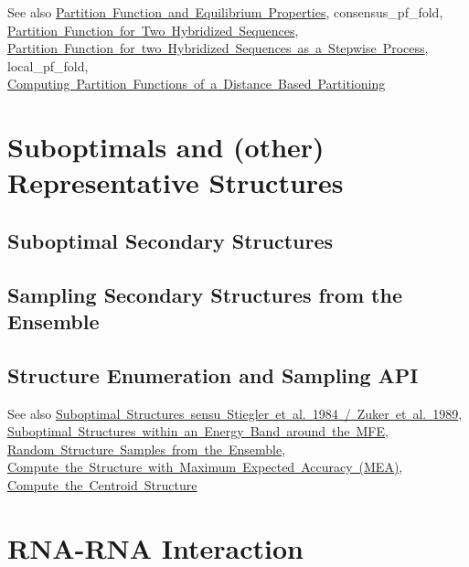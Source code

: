 \begin{DoxySeeAlso}{See also}
\mbox{\hyperlink{group__pf__fold}{Partition Function and Equilibrium Properties}}, consensus\+\_\+pf\+\_\+fold, \mbox{\hyperlink{group__pf__cofold}{Partition Function for Two Hybridized Sequences}}, \mbox{\hyperlink{group__up__cofold}{Partition Function for two Hybridized Sequences as a Stepwise Process}}, local\+\_\+pf\+\_\+fold, \mbox{\hyperlink{group__kl__neighborhood__pf}{Computing Partition Functions of a Distance Based Partitioning}}
\end{DoxySeeAlso}
 \hypertarget{suboptimal_structures}{}\section{Suboptimals and (other) Representative Structures}\label{suboptimal_structures}
\hypertarget{suboptimal_structures_sec_suboptimals}{}\subsection{Suboptimal Secondary Structures}\label{suboptimal_structures_sec_suboptimals}
\hypertarget{suboptimal_structures_sec_samples}{}\subsection{Sampling Secondary Structures from the Ensemble}\label{suboptimal_structures_sec_samples}
\hypertarget{suboptimal_structures_sec_suboptimals_api}{}\subsection{Structure Enumeration and Sampling A\+PI}\label{suboptimal_structures_sec_suboptimals_api}
\begin{DoxySeeAlso}{See also}
\mbox{\hyperlink{group__subopt__zuker}{Suboptimal Structures sensu Stiegler et al. 1984 / Zuker et al. 1989}}, \mbox{\hyperlink{group__subopt__wuchty}{Suboptimal Structures within an Energy Band around the M\+FE}}, \mbox{\hyperlink{group__subopt__stochbt}{Random Structure Samples from the Ensemble}}, \mbox{\hyperlink{group__mea__fold}{Compute the Structure with Maximum Expected Accuracy (M\+EA)}}, \mbox{\hyperlink{group__centroid__fold}{Compute the Centroid Structure}}
\end{DoxySeeAlso}
 \hypertarget{rip}{}\section{R\+N\+A-\/\+R\+NA Interaction}\label{rip}
